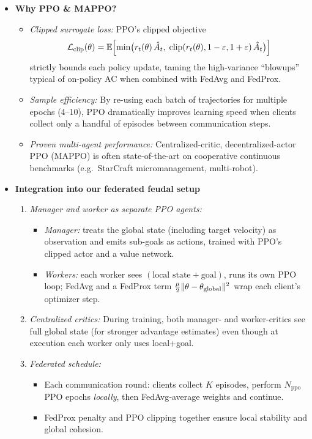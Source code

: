 \documentclass[12pt,a4paper,twoside,openany]{book}
\begin{document}
\begin{itemize}
  \item \textbf{Why PPO \& MAPPO?}
    \begin{itemize}
      \item \emph{Clipped surrogate loss:}  
        PPO’s clipped objective
        \[
          \mathcal{L}_{\mathrm{clip}}(\theta)
          = \mathbb{E}\Bigl[\min\bigl(r_t(\theta)\,\hat A_t,\;\mathrm{clip}(r_t(\theta),1-\varepsilon,1+\varepsilon)\,\hat A_t\bigr)\Bigr]
        \]
        strictly bounds each policy update, taming the high‐variance “blowups” typical of on-policy AC when combined with FedAvg and FedProx.
      \item \emph{Sample efficiency:}  
        By re-using each batch of trajectories for multiple epochs (4–10), PPO dramatically improves learning speed when clients collect only a handful of episodes between communication steps.
      \item \emph{Proven multi-agent performance:}  
        Centralized-critic, decentralized-actor PPO (MAPPO) is often state-of-the-art on cooperative continuous benchmarks (e.g.\ StarCraft micromanagement, multi-robot).
    \end{itemize}

  \item \textbf{Integration into our federated feudal setup}
    \begin{enumerate}
      \item \emph{Manager and worker as separate PPO agents:}
        \begin{itemize}
          \item \emph{Manager:}  treats the global state (including target velocity) as observation and emits sub-goals as actions, trained with PPO’s clipped actor and a value network.
          \item \emph{Workers:}  each worker sees $(\text{local state}+\text{goal})$, runs its own PPO loop; FedAvg and a FedProx term $\frac{\mu}{2}\|\theta - \theta_{\rm global}\|^2$ wrap each client’s optimizer step.
        \end{itemize}
      \item \emph{Centralized critics:}  
        During training, both manager- and worker-critics see full global state (for stronger advantage estimates) even though at execution each worker only uses local+goal.
      \item \emph{Federated schedule:}  
        \begin{itemize}
          \item Each communication round: clients collect $K$ episodes, perform $N_{\mathrm{ppo}}$ PPO epochs {\it locally}, then FedAvg‐average weights and continue.
          \item FedProx penalty and PPO clipping together ensure local stability and global cohesion.
        \end{itemize}
    \end{enumerate}


\end{itemize}
\end{document}
